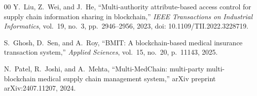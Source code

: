 \documentclass[conference]{IEEEtran}
\begin{document}
\begin{thebibliography}{00}
Y.\ Liu, Z.\ Wei, and J.\ He, ``Multi-authority attribute-based access control for supply chain information sharing in blockchain,'' \textit{IEEE Transactions on Industrial Informatics}, vol.~19, no.~3, pp.~2946--2956, 2023, doi: 10.1109/TII.2022.3228719.

S.\ Ghosh, D.\ Sen, and A.\ Roy, ``BMIT: A blockchain-based medical insurance transaction system,'' \textit{Applied Sciences}, vol.~15, no.~20, p.~11143, 2025.

N.\ Patel, R.\ Joshi, and A.\ Mehta, ``Multi-MedChain: multi-party multi-blockchain medical supply chain management system,'' arXiv preprint arXiv:2407.11207, 2024.

\end{thebibliography}
\end{document}
